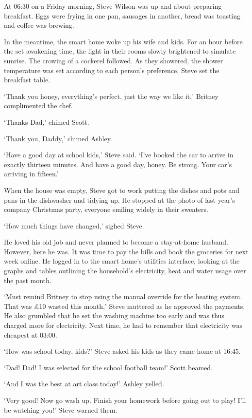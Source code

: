 At 06:30 on a Friday morning, Steve Wilson was up and about preparing breakfast. Eggs were frying in one pan, sausages in another, bread was toasting and coffee was brewing.

In the meantime, the smart home woke up his wife and kids. For an hour before the set awakening time, the light in their rooms slowly brightened to simulate sunrise. The crowing of a cockerel followed. As they showered, the shower temperature was set according to each person's preference, Steve set the breakfast table.

`Thank you honey, everything's perfect, just the way we like it,' Britney complimented the chef.

`Thanks Dad,' chimed Scott.

`Thank you, Daddy,' chimed Ashley.

`Have a good day at school kids,' Steve said. `I've booked the car to arrive in exactly thirteen minutes. And have a good day, honey. Be strong. Your car's arriving in fifteen.'

When the house was empty, Steve got to work putting the dishes and pots and pans in the dishwasher and tidying up. He stopped at the photo of last year's company Christmas party, everyone smiling widely in their sweaters.

`How much things have changed,' sighed Steve.

He loved his old job and never planned to become a stay-at-home husband. However, here he was. It was time to pay the bills and book the groceries for next week online. He logged in to the smart home's utilities interface, looking at the graphs and tables outlining the household's electricity, heat and water usage over the past month.

`Must remind Britney to stop using the manual override for the heating system. That was \pounds10 wasted this month,' Steve muttered as he approved the payments. He also grumbled that he set the washing machine too early and was thus charged more for electricity. Next time, he had to remember that electricity was cheapest at 03:00.

`How was school today, kids?' Steve asked his kids as they came home at 16:45.

`Dad! Dad! I was selected for the school football team!' Scott beamed.

`And I was the best at art class today!' Ashley yelled.

`Very good! Now go wash up. Finish your homework before going out to play! I'll be watching you!' Steve warned them.

